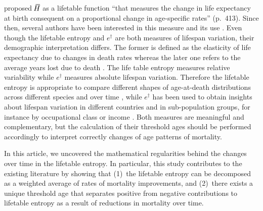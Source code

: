 \documentclass[a4paper,twoside, openright, 12pt, leqno]{article}
\newcommand*\xbar[1]{%
   \hbox{%
     \vbox{%
       \hrule height 0.5pt %
       \kern0.3ex%
       \hbox{%
         \kern-0.28em%
         \ensuremath{#1}%
         \kern-0.05em%
       }%
     }%
   }%
}
\begin{document}
 \cite{Keyfitz1977} proposed $\,\xbar{H}$ as a lifetable function ``that measures the change in life expectancy at birth consequent on a proportional change in age-specific rates'' (p.~413). Since then, several authors have been interested in this measure and its use \citep{demetrius1978adaptive, Demetrius1979,mitra1978short,Goldman1986,Vaupel1986,Hakkert1987,hill1993entropy,Fernandez2015}. Even though the lifetable entropy and $e^\dagger$ are both measures of lifespan variation, their demographic interpretation differs. The former is defined as the elasticity of life expectancy due to changes in death rates \citep{keyfitz1968introduction} whereas the later one refers to the average years lost due to death \citep{Vaupel2011}. The life table entropy measures relative variability while $e^\dagger$ measures absolute lifespan variation. Therefore the lifetable entropy is appropriate to compare different shapes of age-at-death distributions across different species and over time \citep{Baudisch2011, Wrycza2015}, while $e^\dagger$ has been used to obtain insights about lifespan variation in different countries and in sub-population groups, for instance by occupational class or income \citep{vanRaalte2014,bronnum2017socially}. Both measures are meaningful and complementary, but the calculation of their threshold ages should be performed accordingly to interpret correctly changes of age patterns of mortality.
  
 In this article, we uncovered the mathematical regularities behind the changes over time in the lifetable entropy. In particular, this study contributes to the existing literature by showing that (1)~the lifetable entropy can be decomposed as a weighted average of rates of mortality improvements, and (2)~there exists a unique threshold age that separates positive from negative contributions to lifetable entropy as a result of reductions in mortality over time.



\newpage
\linespread{1}\normalsize






\newpage
\end{document}
